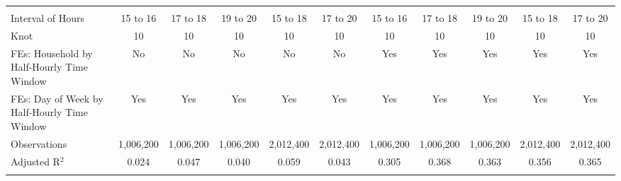 \begin{table}[!htbp]
\begin{longtable}{@{\extracolsep{0pt}}lcccccccccc}
\hline \\[-1.8ex] 
Interval of Hours & 15 to 16 & 17 to 18 & 19 to 20 & 15 to 18 & 17 to 20 & 15 to 16 & 17 to 18 & 19 to 20 & 15 to 18 & 17 to 20 \\ 
Knot & 10 & 10 & 10 & 10 & 10 & 10 & 10 & 10 & 10 & 10 \\ 
FEs: Household by Half-Hourly Time Window & No & No & No & No & No & Yes & Yes & Yes & Yes & Yes \\ 
FEs: Day of Week by Half-Hourly Time Window & Yes & Yes & Yes & Yes & Yes & Yes & Yes & Yes & Yes & Yes \\ 
Observations & 1,006,200 & 1,006,200 & 1,006,200 & 2,012,400 & 2,012,400 & 1,006,200 & 1,006,200 & 1,006,200 & 2,012,400 & 2,012,400 \\ 
Adjusted R$^{2}$ & 0.024 & 0.047 & 0.040 & 0.059 & 0.043 & 0.305 & 0.368 & 0.363 & 0.356 & 0.365 \\ 
\hline 
\hline \\[-1.8ex] 
\end{longtable} 
\end{table} 
